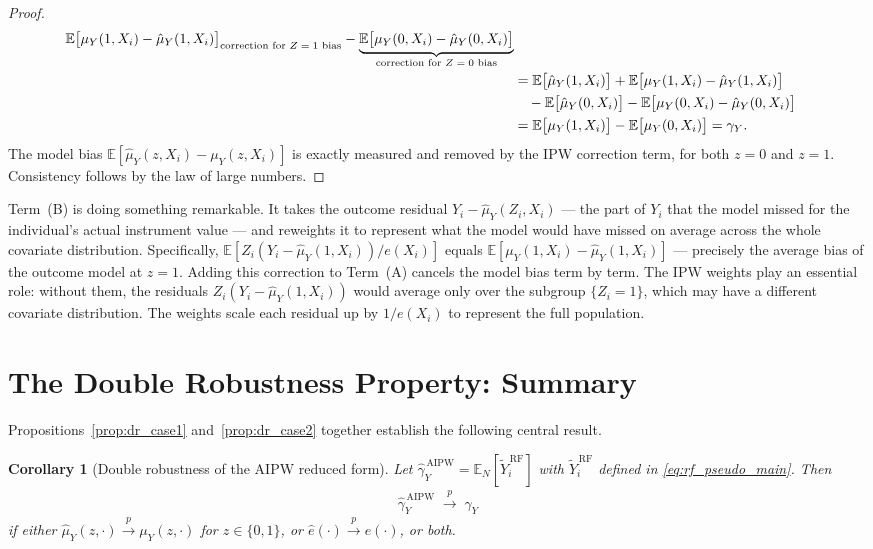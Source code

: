 \documentclass[12pt,a4paper]{article}
\newtheorem{corollary}{Corollary}
\theoremstyle{remark}
\newcommand{\E}{\mathbb{E}}
\newcommand{\En}{\mathbb{E}_N}
\newcommand{\muY}{\mu_Y}
\newcommand{\muYhat}{\hat{\mu}_Y}
\newcommand{\ehat}{\hat{e}}
\newcommand{\YRF}{\widetilde{Y}^{\,\mathrm{RF}}}
\newenvironment{intuition}[1]{%
  \begin{tcolorbox}[
    enhanced,
    colback=remarkbg,
    colframe=remarkframe,
    arc=3pt,
    boxrule=0.6pt,
    left=8pt, right=8pt, top=6pt, bottom=6pt,
    title={\small\textit{Intuition: #1}},
    fonttitle=\bfseries\small,
    coltitle=black
  ]
  \small
}{%
  \end{tcolorbox}
}
\begin{document}
\begin{proof}
\begin{align}
{    \E\bigl[\muY(1,X_i) - \muYhat(1,X_i)\bigr]
  }_{\text{correction for $Z=1$ bias}}
  -
  \underbrace{
    \E\bigl[\muY(0,X_i) - \muYhat(0,X_i)\bigr]
  }_{\text{correction for $Z=0$ bias}}
  \notag \\
  &=
  \E\bigl[\muYhat(1,X_i)\bigr]
  + \E\bigl[\muY(1,X_i) - \muYhat(1,X_i)\bigr]
  \notag \\
  &\quad
  -\E\bigl[\muYhat(0,X_i)\bigr]
  - \E\bigl[\muY(0,X_i) - \muYhat(0,X_i)\bigr]
  \notag \\
  &=
  \E\bigl[\muY(1,X_i)\bigr] - \E\bigl[\muY(0,X_i)\bigr]
  = \gamma_Y.
  \label{eq:case2_result}
\end{align}
The model bias $\E[\muYhat(z,X_i) - \muY(z,X_i)]$ is exactly measured and removed by
the IPW correction term, for both $z=0$ and $z=1$. Consistency follows by the law of
large numbers.
\end{proof}

\begin{intuition}{What the correction term is measuring when the propensity score is correct}
Term~(B) is doing something remarkable. It takes the outcome residual
$Y_i - \muYhat(Z_i,X_i)$ --- the part of $Y_i$ that the model missed for the
individual's actual instrument value --- and reweights it to represent what the
model would have missed on average across the whole covariate distribution. Specifically,
$\E[Z_i(Y_i - \muYhat(1,X_i))/e(X_i)]$ equals $\E[\muY(1,X_i) - \muYhat(1,X_i)]$
--- precisely the average bias of the outcome model at $z=1$. Adding this correction
to Term~(A) cancels the model bias term by term. The IPW weights play an essential
role: without them, the residuals $Z_i(Y_i-\muYhat(1,X_i))$ would average only over
the subgroup $\{Z_i=1\}$, which may have a different covariate distribution. The
weights scale each residual up by $1/e(X_i)$ to represent the full population.
\end{intuition}

\section{The Double Robustness Property: Summary}
\label{sec:dr_summary}

Propositions~\ref{prop:dr_case1} and~\ref{prop:dr_case2} together establish the
following central result.

\begin{corollary}[Double robustness of the AIPW reduced form]
\label{cor:dr}
Let $\hat{\gamma}_Y^{\,\mathrm{AIPW}} = \En[\YRF_i]$ with $\YRF_i$ defined in
\eqref{eq:rf_pseudo_main}. Then
\begin{align}
  \hat{\gamma}_Y^{\,\mathrm{AIPW}} \;\xrightarrow{p}\; \gamma_Y
\end{align}
if \emph{either} $\muYhat(z,\cdot) \xrightarrow{p} \muY(z,\cdot)$ for $z \in \{0,1\}$,
\emph{or} $\ehat(\cdot) \xrightarrow{p} e(\cdot)$, or both.
\end{corollary}
\end{document}
